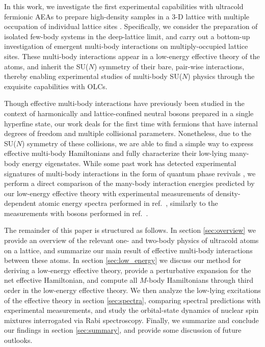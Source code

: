 \documentclass[preprint,showkeys,nofootinbib]{revtex4-1}
\newcommand{\1}{\mathds{1}}
\begin{document}
In this work, we investigate the first experimental capabilities with
ultracold fermionic AEAs to prepare high-density samples in a 3-D
lattice with multiple occupation of individual lattice sites
\cite{goban2018emergence}.  Specifically, we consider the preparation
of isolated few-body systems in the deep-lattice limit, and carry out
a bottom-up investigation of emergent multi-body interactions on
multiply-occupied lattice sites.  These multi-body interactions appear
in a low-energy effective theory of the atoms, and inherit the SU($N$)
symmetry of their bare, pair-wise interactions, thereby enabling
experimental studies of multi-body SU($N$) physics through the
exquisite capabilities with OLCs.

Though effective multi-body interactions have previously been studied
in the context of harmonically \cite{johnson2012effective,
  yin2014universal} and lattice-confined \cite{johnson2009effective}
neutral bosons prepared in a single hyperfine state, our work deals
for the first time with fermions that have internal degrees of freedom
and multiple collisional parameters.  Nonetheless, due to the SU($N$)
symmetry of these collisions, we are able to find a simple way to
express effective multi-body Hamiltonians and fully characterize their
low-lying many-body energy eigenstates.  While some past work has
detected experimental signatures of multi-body interactions in the
form of quantum phase revivals \cite{will2010timeresolved}, we perform
a direct comparison of the many-body interaction energies predicted by
our low-energy effective theory with experimental measurements of
density-dependent atomic energy spectra performed in
ref.~\cite{goban2018emergence}, similarly to the measurements with
bosons performed in ref.~\cite{mark2011precision}.

The remainder of this paper is structured as follows.  In section
\ref{sec:overview} we provide an overview of the relevant one- and
two-body physics of ultracold atoms on a lattice, and summarize our
main result of effective multi-body interactions between these atoms.
In section \ref{sec:low_energy} we discuss our method for deriving a
low-energy effective theory, provide a perturbative expansion for the
net effective Hamiltonian, and compute all $M$-body Hamiltonians
through third order in the low-energy effective theory.  We then
analyze the low-lying excitations of the effective theory in section
\ref{sec:spectra}, comparing spectral predictions with experimental
measurements, and study the orbital-state dynamics of nuclear spin
mixtures interrogated via Rabi spectroscopy.  Finally, we summarize
and conclude our findings in section \ref{sec:summary}, and provide
some discussion of future outlooks.
\end{document}
